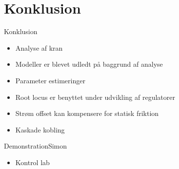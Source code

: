 













\section{Konklusion}




\begin{frame}{Konklusion}{}
  \begin{itemize}
    \item<1-> Analyse af kran  
    \item<2-> Modeller er blevet udledt på baggrund af analyse  
    \item<3-> Parameter estimeringer 
    \item<4-> Root locus er benyttet under udvikling af regulatorer 
    \item<5-> Strøm offset kan kompensere for statisk friktion
    \item<6-> Kaskade kobling  
  \end{itemize}
\end{frame}




\begin{frame}{Demonstration}{Simon}
  \begin{itemize}
    \item<1-> Kontrol lab
  \end{itemize}
\end{frame}
